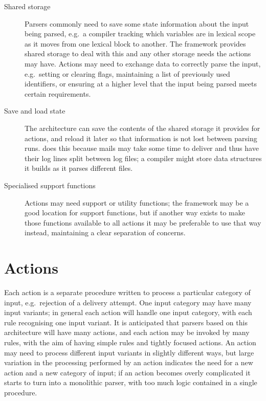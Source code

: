 \begin{description}
    \item [Shared storage]  Parsers commonly need to save some state
        information about the input being parsed, e.g.\ a compiler tracking
        which variables are in lexical scope as it moves from one lexical
        block to another.  The framework provides shared storage to deal
        with this and any other storage needs the actions may have.
        Actions may need to exchange data to correctly parse the input,
        e.g.\ setting or clearing flags, maintaining a list of previously
        used identifiers, or ensuring at a higher level that the input
        being parsed meets certain requirements.

    \item [Save and load state]  The architecture can save the contents of
        the shared storage it provides for actions, and reload it later so
        that information is not lost between parsing runs.  \parsername{}
        does this because mails may take some time to deliver
        and thus have their log lines split between log files; a compiler
        might store data structures it builds as it parses different files.

    \item [Specialised support functions]  Actions may need support or
        utility functions; the framework may be a good location for support
        functions, but if another way exists to make those functions
        available to all actions it may be preferable to use that way
        instead, maintaining a clear separation of concerns.

\end{description}

\section{Actions}

\label{actions in architecture}

Each action is a separate procedure written to process a particular
category of input, e.g.\ rejection of a delivery attempt.  One input
category may have many input variants; in general each action will handle
one input category, with each rule recognising one input variant.  It is
anticipated that parsers based on this architecture will have many actions,
and each action may be invoked by many rules, with the aim of having simple
rules and tightly focused actions.  An action may need to process different
input variants in slightly different ways, but large variation in the
processing performed by an action indicates the need for a new action and a
new category of input; if an action becomes overly complicated it starts to
turn into a monolithic parser, with too much logic contained in a single
procedure.

